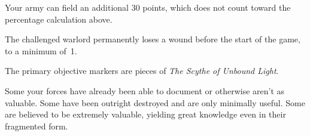 Your army can field an additional 30 points, which does not count
  toward the percentage calculation above.

  The challenged warlord permanently loses a wound before the start of
  the game, to a minimum of~1.


The primary objective markers are pieces of \emph{The Scythe of Unbound Light}.

Some your forces have already been able to document or otherwise
aren't as valuable.  Some have been outright destroyed and are only
minimally useful.  Some are believed to be extremely valuable,
yielding great knowledge even in their fragmented form.
